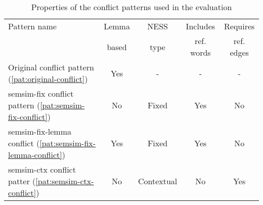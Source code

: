 \documentclass[11pt]{scrreprt}
\begin{document}
\begin{table}
\centering
\begin{tabular}{lcccc}
\toprule
\multicolumn{1}{l}{Pattern name}		& \multicolumn{1}{c}{Lemma}		& \multicolumn{1}{c}{NESS}	& \multicolumn{1}{c}{Includes}		& \multicolumn{1}{c}{Requires} \\
\multicolumn{1}{l}{} 				& \multicolumn{1}{c}{based} 		& \multicolumn{1}{c}{type} 		& \multicolumn{1}{c}{ref. words} 	& \multicolumn{1}{c}{ref. edges} \\
\midrule
Original conflict pattern (\ref{pat:original-conflict})					& Yes 		& - 		& -			& - \\
semsim-fix conflict pattern (\ref{pat:semsim-fix-conflict})				& No		& Fixed		& Yes		& No \\
semsim-fix-lemma conflict (\ref{pat:semsim-fix-lemma-conflict}) 		& Yes 		& Fixed		& Yes		& No \\
semsim-ctx conflict patter (\ref{pat:semsim-ctx-conflict})				& No		& Contextual	& No		& Yes \\
\bottomrule
\end{tabular}
\caption{Properties of the conflict patterns used in the evaluation}
\label{tab:evaluation-patterns}
\end{table}
\end{document}
